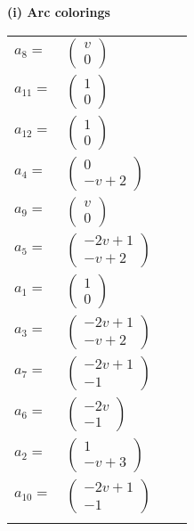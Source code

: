 \documentclass[1p]{elsarticle_modified}
\theoremstyle{definition}
\begin{document}
\flushleft \textbf{(i) Arc colorings}\\
\begin{tabular}{m{7pt} m{180pt} m{7pt} m{180pt} }
\flushright $a_{8}=$&$\begin{pmatrix}v\\0\end{pmatrix}$ \\
\flushright $a_{11}=$&$\begin{pmatrix}1\\0\end{pmatrix}$ \\
\flushright $a_{12}=$&$\begin{pmatrix}1\\0\end{pmatrix}$ \\
\flushright $a_{4}=$&$\begin{pmatrix}0\\- v+2\end{pmatrix}$ \\
\flushright $a_{9}=$&$\begin{pmatrix}v\\0\end{pmatrix}$ \\
\flushright $a_{5}=$&$\begin{pmatrix}-2 v+1\\- v+2\end{pmatrix}$ \\
\flushright $a_{1}=$&$\begin{pmatrix}1\\0\end{pmatrix}$ \\
\flushright $a_{3}=$&$\begin{pmatrix}-2 v+1\\- v+2\end{pmatrix}$ \\
\flushright $a_{7}=$&$\begin{pmatrix}-2 v+1\\-1\end{pmatrix}$ \\
\flushright $a_{6}=$&$\begin{pmatrix}-2 v\\-1\end{pmatrix}$ \\
\flushright $a_{2}=$&$\begin{pmatrix}1\\- v+3\end{pmatrix}$ \\
\flushright $a_{10}=$&$\begin{pmatrix}-2 v+1\\-1\end{pmatrix}$\\&\end{tabular}
\end{document}
